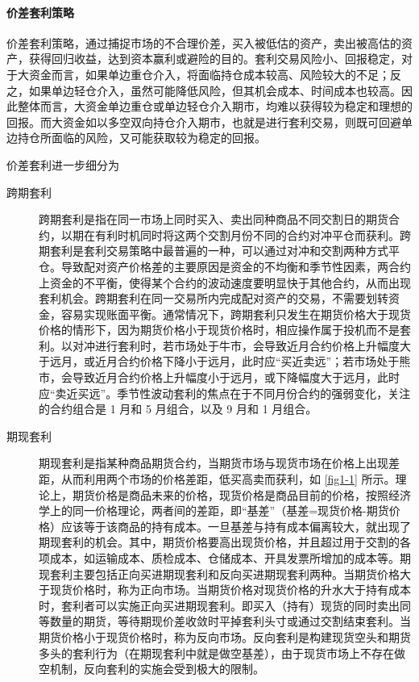 \paragraph{价差套利策略} 价差套利策略，通过捕捉市场的不合理价差，买入被低估的资产，卖出被高估的资产，获得回归收益，达到资本赢利或避险的目的。套利交易风险小、回报稳定，对于大资金而言，如果单边重仓介入，将面临持仓成本较高、风险较大的不足；反之，如果单边轻仓介入，虽然可能降低风险，但其机会成本、时间成本也较高。因此整体而言，大资金单边重仓或单边轻仓介入期市，均难以获得较为稳定和理想的回报。而大资金如以多空双向持仓介入期市，也就是进行套利交易，则既可回避单边持仓所面临的风险，又可能获取较为稳定的回报。

价差套利进一步细分为

\begin{description}
    \item[跨期套利] 跨期套利是指在同一市场上同时买入、卖出同种商品不同交割日的期货合约，以期在有利时机同时将这两个交割月份不同的合约对冲平仓而获利。跨期套利是套利交易策略中最普遍的一种，可以通过对冲和交割两种方式平仓。导致配对资产价格差的主要原因是资金的不均衡和季节性因素，两合约上资金的不平衡，使得某个合约的波动速度要明显快于其他合约，从而出现套利机会。跨期套利在同一交易所内完成配对资产的交易，不需要划转资金，容易实现账面平衡。通常情况下，跨期套利只发生在期货价格大于现货价格的情形下，因为期货价格小于现货价格时，相应操作属于投机而不是套利。以对冲进行套利时，若市场处于牛市，会导致近月合约价格上升幅度大于远月，或近月合约价格下降小于远月，此时应“买近卖远”；若市场处于熊市，会导致近月合约价格上升幅度小于远月，或下降幅度大于远月，此时应“卖近买远”。季节性波动套利的焦点在于不同月份合约的强弱变化，关注的合约组合是 1 月和 5 月组合，以及 9 月和 1 月组合。
    \item[期现套利] 期现套利是指某种商品期货合约，当期货市场与现货市场在价格上出现差距，从而利用两个市场的价格差距，低买高卖而获利，如 \autoref{fig1-1} 所示。理论上，期货价格是商品未来的价格，现货价格是商品目前的价格，按照经济学上的同一价格理论，两者间的差距，即“基差”（基差=现货价格-期货价格）应该等于该商品的持有成本。一旦基差与持有成本偏离较大，就出现了期现套利的机会。其中，期货价格要高出现货价格，并且超过用于交割的各项成本，如运输成本、质检成本、仓储成本、开具发票所增加的成本等。期现套利主要包括正向买进期现套利和反向买进期现套利两种。当期货价格大于现货价格时，称为正向市场。当期货价格对现货价格的升水大于持有成本时，套利者可以实施正向买进期现套利。即买入（持有）现货的同时卖出同等数量的期货，等待期现价差收敛时平掉套利头寸或通过交割结束套利。当期货价格小于现货价格时，称为反向市场。反向套利是构建现货空头和期货多头的套利行为（在期现套利中就是做空基差），由于现货市场上不存在做空机制，反向套利的实施会受到极大的限制。

\end{description}
